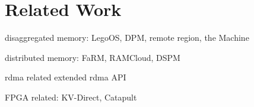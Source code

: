 \section{Related Work}
\label{sec:related}

disaggregated memory:
LegoOS, DPM, remote region, the Machine

distributed memory:
FaRM, RAMCloud, DSPM

rdma related
extended rdma API

FPGA related:
KV-Direct, Catapult
